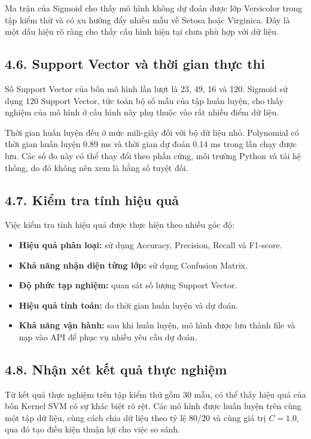 \documentclass{article}
\begin{document}
	Ma trận của Sigmoid cho thấy mô hình không dự đoán được lớp Versicolor trong tập kiểm thử và có xu hướng đẩy nhiều mẫu về Setosa hoặc Virginica. Đây là một dấu hiệu rõ ràng cho thấy cấu hình hiện tại chưa phù hợp với dữ liệu.
	
	\subsection{4.6. Support Vector và thời gian thực thi}
	\hspace{0.5cm}
	Số Support Vector của bốn mô hình lần lượt là 23, 49, 16 và 120. Sigmoid sử dụng 120 Support Vector, tức toàn bộ số mẫu của tập huấn luyện, cho thấy nghiệm của mô hình ở cấu hình này phụ thuộc vào rất nhiều điểm dữ liệu.
	
	Thời gian huấn luyện đều ở mức mili-giây đối với bộ dữ liệu nhỏ. Polynomial có thời gian huấn luyện 0.89 ms và thời gian dự đoán 0.14 ms trong lần chạy được lưu. Các số đo này có thể thay đổi theo phần cứng, môi trường Python và tải hệ thống, do đó không nên xem là hằng số tuyệt đối.
	
	\subsection{4.7. Kiểm tra tính hiệu quả}
	\hspace{0.5cm}
	Việc kiểm tra tính hiệu quả được thực hiện theo nhiều góc độ:
	\begin{itemize}
		\item \textbf{Hiệu quả phân loại:} sử dụng Accuracy, Precision, Recall và F1-score.
		\item \textbf{Khả năng nhận diện từng lớp:} sử dụng Confusion Matrix.
		\item \textbf{Độ phức tạp nghiệm:} quan sát số lượng Support Vector.
		\item \textbf{Hiệu quả tính toán:} đo thời gian huấn luyện và dự đoán.
		\item \textbf{Khả năng vận hành:} sau khi huấn luyện, mô hình được lưu thành file và nạp vào API để phục vụ nhiều yêu cầu dự đoán.
	\end{itemize}
	
	\subsection{4.8. Nhận xét kết quả thực nghiệm}
	\hspace{0.5cm}
	Từ kết quả thực nghiệm trên tập kiểm thử gồm 30 mẫu, có thể thấy hiệu quả của bốn Kernel SVM có sự khác biệt rõ rệt. Các mô hình được huấn luyện trên cùng một tập dữ liệu, cùng cách chia dữ liệu theo tỷ lệ 80/20 và cùng giá trị $C=1.0$, qua đó tạo điều kiện thuận lợi cho việc so sánh.
	
\end{document}
